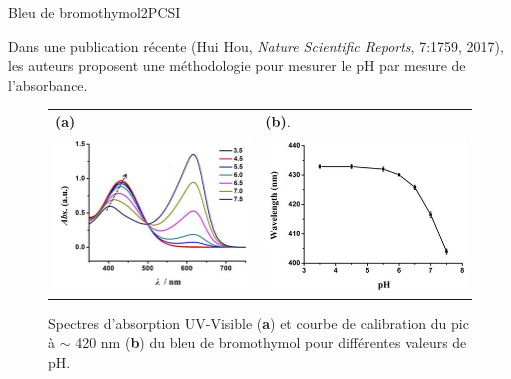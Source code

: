 \begin{exercise}{Bleu de bromothymol}{2}{PCSI}
\begin{questions}
\begin{EnvUplevel}
    Dans une publication récente (Hui Hou, \emph{Nature Scientific Reports}, 7:1759, 2017), les auteurs proposent une méthodologie pour mesurer le pH par mesure de l'absorbance.
    \begin{figure}[H]
        \centering
        \begin{tabularx}{\linewidth}{XX}
            \small{\textbf{(a)}} & \small{\textbf{(b)}}. \\
            \includegraphics[width=\linewidth]{chimiePC/orga/BBT2.png} &
            \includegraphics[width=\linewidth]{chimiePC/orga/BBT3.png}
        \end{tabularx}\vspace{-1em}
        \caption{Spectres d'absorption UV-Visible (\textbf{a}) et courbe de calibration du pic à $\sim$ 420 nm (\textbf{b}) du bleu de bromothymol pour différentes valeurs de pH.}
        \label{fig:BBT2}
    \end{figure}
\end{EnvUplevel}\vspace{-1em}


\end{questions}
\end{exercise}

